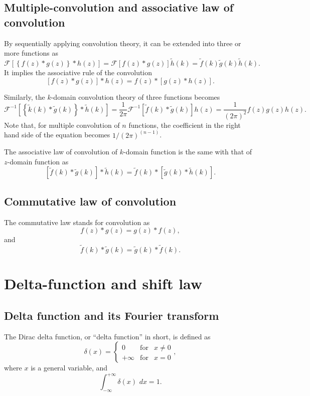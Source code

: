 \documentclass[a4paper]{article}
\newcommand{\intinfty}{\int^{+\infty}_{-\infty}\xspace}
\newcommand{\ftf}[1]{{\mathcal{F}\left[#1\right]\xspace}}
\newcommand{\iftf}[1]{{\mathcal{F}^{-1}\left[#1\right]\xspace}}
\newcommand{\ftt}[1]{{\tilde{#1}\xspace}}
\begin{document}
\subsection{Multiple-convolution and associative law of convolution}
By sequentially applying convolution theory, it can be extended into three or more functions as
\begin{equation}
	\ftf{\left\{f(z) * g(z)\right\} * h(z)}
	 = \ftf{f(z) * g(z)}\ftt{h}(k) = \ftt{f}(k)\ftt{g}(k)\ftt{h}(k).
\end{equation}
It implies the associative rule of the convolution
\begin{equation}
	\left[f(z)*g(z)\right]*h(z)=f(z)*\left[g(z)*h(z)\right].
\end{equation}

Similarly, the $k$-domain convolution theory of three functions becomes
\begin{equation}
	\iftf{\left\{\ftt{k}(k)* \ftt{g}(k)\right\}*\ftt{h}(k)}
	= \frac{1}{2\pi}\iftf{\ftt{f}(k)*\ftt{g}(k)}h(z) = \frac{1}{\left(2\pi\right)^2}f(z)g(z)h(z).
\end{equation}
Note that, for multiple convolution of $n$ functions, the coefficient in the right hand side of the equation becomes $1/(2\pi)^{(n-1)}$.

The associative law of convolution of $k$-domain function is the same with that of $z$-domain function as
\begin{equation}
	\left[\ftt{f}(k)*\ftt{g}(k)\right]*\ftt{h}(k) = \ftt{f}(k) * \left[\ftt{g}(k)*\ftt{h}(k)\right].
\end{equation}

\subsection{Commutative law of convolution}
The commutative law stands for convolution as
\begin{equation}
	f(z) * g(z) = g(z) * f(z),
\end{equation}
and
\begin{equation}
	\ftt{f}(k) * \ftt{g}(k) = \ftt{g}(k) * \ftt{f}(k).
\end{equation}

\section{Delta-function and shift law}
\subsection{Delta function and its Fourier transform}
The Dirac delta function, or ``delta function'' in short, is defined as
\begin{equation}
	\delta\left( x \right) =
	\left\{
		\begin{array}{ccl}
			0& \mathrm{for} & x \neq 0\\
			+\infty& \mathrm{for} & x = 0	
		\end{array}
	\right.,
\end{equation}
where $x$ is a general variable, and
\begin{equation}
	\intinfty \delta\left( x \right)\,\, dx = 1.
\end{equation}
\end{document}
